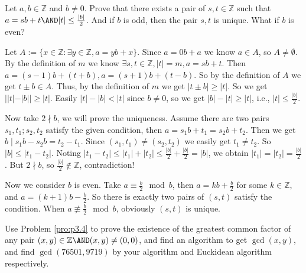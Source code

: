 \documentclass{ctexart}
\begin{document}
\begin{problem}\label{pro:p3.4}
  Let \(a,b \in \mathbb{Z}\) and \(b \neq 0\). Prove that there exists a pair of \(s,t \in \mathbb{Z}\) such that \(a=sb + t \AND |t|\leq \frac{|b|}{2}\).
  And if \(b\) is odd, then the pair \(s,t\) is unique.
  What if \(b\) is even?
\end{problem}
\begin{solution}
  Let \(A:=\{x \in \mathbb{Z}:\exists y \in \mathbb{Z},a=yb+x\}\).
  Since \(a=0b+a\) we know \(a \in A\), so \(A \neq \emptyset\).
  By the definition of \(m\) we know \(\exists s,t \in \mathbb{Z},|t|=m,a=sb+t\).
  Then \(a=(s-1)b+(t+b),a=(s+1)b+(t-b)\). So by the definition of \(A\) we get \(t \pm b \in A\).
  Thus, by the definition of \(m\) we get \(|t \pm b| \geq |t|\).
  So we get \(||t|-|b|| \geq |t|\). Easily \(|t|-|b| < |t|\) since \(b \neq 0\), so we get \(|b|-|t| \geq |t|\), i.e., \(|t|\leq\frac{|b|}{2}\).

  Now take \(2 \nmid b\), we will prove the uniqueness.
  Assume there are two pairs \(s_1,t_1; s_2,t_2\) satisfy the given condition, then \(a=s_1 b + t_1=s_2 b + t_2\).
  Then we get \(b \mid s_1 b-s_2 b = t_2 - t_1\). Since \((s_1,t_1)\neq(s_2,t_2)\) we easily get \(t_1 \neq t_2\).
  So \(|b| \leq |t_1-t_2|\). Noting \(|t_1-t_2| \leq |t_1|+|t_2| \leq \frac{|b|}{2}+\frac{|b|}{2} = |b|\),
  we obtain \(|t_1|=|t_2|=\frac{|b|}{2}\).
  But \(2 \nmid b\), so \(\frac{|b|}{2}\notin \mathbb{Z}\), contradiction!

  Now we consider \(b \) is even.
  Take \(a \equiv \frac{b}{2}\mod b\), then \(a=kb + \frac{b}{2}\) for some \(k \in \mathbb{Z}\), and \(a=(k+1)b - \frac{b}{2}\).
  So there is exactly two pairs of \((s,t)\) satisfy the condition.
  When \(a \not \equiv \frac{b}{2} \mod b\), obviously \((s,t)\) is unique.
\end{solution}
\begin{problem}\label{pro:p6.3}
  Use Problem \ref{pro:p3.4} to prove the existence of the greatest common factor of any pair \((x,y) \in \mathbb{Z} \AND (x,y)\neq (0,0)\),
  and find an algorithm to get \(\gcd(x,y)\), and find \(\gcd(76501,9719)\) by your algorithm and Euckidean algorithm respectively.
\end{problem}
\end{document}
